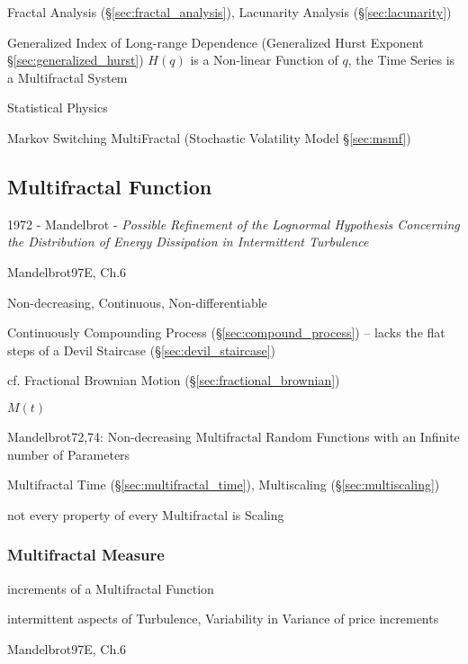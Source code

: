 Fractal Analysis (\S\ref{sec:fractal_analysis}), Lacunarity Analysis
(\S\ref{sec:lacunarity})

Generalized Index of Long-range Dependence (Generalized Hurst Exponent
\S\ref{sec:generalized_hurst}) $H(q)$ is a Non-linear Function of $q$, the Time
Series is a Multifractal System

Statistical Physics

\fist Markov Switching MultiFractal (Stochastic Volatility Model
\S\ref{sec:msmf})



\subsection{Multifractal Function}\label{sec:multifractal_function}

1972 - Mandelbrot - \emph{Possible Refinement of the Lognormal Hypothesis
  Concerning the Distribution of Energy Dissipation in Intermittent Turbulence}

Mandelbrot97E, Ch.6

Non-decreasing, Continuous, Non-differentiable

Continuously Compounding Process (\S\ref{sec:compound_process})
-- lacks the flat steps of a Devil Staircase (\S\ref{sec:devil_staircase})

cf. Fractional Brownian Motion (\S\ref{sec:fractional_brownian})

$M(t)$

Mandelbrot72,74: Non-decreasing Multifractal Random Functions with an Infinite
number of Parameters

Multifractal Time (\S\ref{sec:multifractal_time}), Multiscaling
(\S\ref{sec:multiscaling})

not every property of every Multifractal is Scaling



\subsubsection{Multifractal Measure}\label{sec:multifractal_measure}

increments of a Multifractal Function

intermittent aspects of Turbulence, Variability in Variance of price increments

Mandelbrot97E, Ch.6

